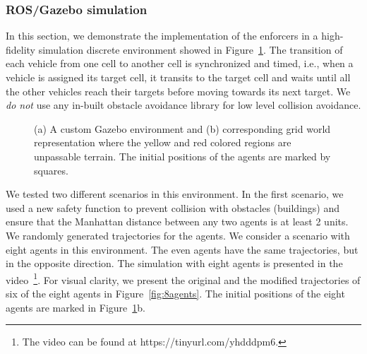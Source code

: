 \subsubsection{ROS/Gazebo simulation}

In this section, we demonstrate the implementation of the enforcers in a high-fidelity simulation discrete environment showed in Figure~\ref{fig:sims}. The transition of each vehicle from one cell to another cell is synchronized and timed, i.e.,  when a vehicle is assigned its target cell, it transits to the target cell and waits until all the other vehicles reach their targets before moving towards its next target. 
We \emph{do not} use any in-built obstacle avoidance library for low level collision avoidance.

\begin{figure}[!htp]
\centering
{}
\caption{(a) A custom Gazebo environment and (b) corresponding grid world representation where the yellow and red colored regions are unpassable terrain. The initial positions of the agents are marked by squares. }
\label{fig:sims}
\end{figure}

We tested two different scenarios in this environment. In the first scenario, we used a new safety function to prevent collision with obstacles (buildings) and ensure that the Manhattan distance between any two agents is at least 2 units. We randomly generated trajectories for the agents. We consider a scenario with eight agents in this environment. The even agents have the same trajectories, but in the opposite direction. The simulation with eight agents is presented in the video~\footnote{ The video can be found at https://tinyurl.com/yhdddpm6.}. For visual clarity, we present the original and the modified trajectories of six of the eight agents in Figure~\ref{fig:8agents}. The initial positions of the eight agents are marked in Figure~\ref{fig:sims}b.

